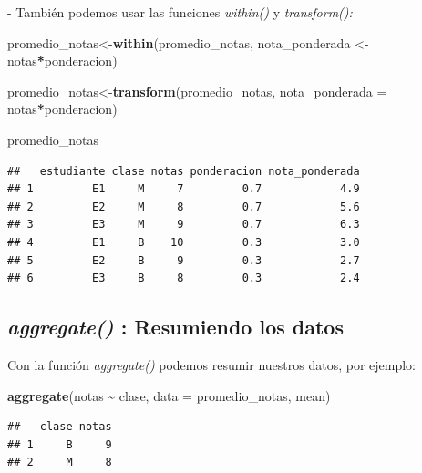 \documentclass[
]{book}
\newenvironment{Shaded}{\begin{snugshade}}{\end{snugshade}}
\newcommand{\AttributeTok}[1]{\textcolor[rgb]{0.13,0.29,0.53}{#1}}
\newcommand{\FunctionTok}[1]{\textcolor[rgb]{0.13,0.29,0.53}{\textbf{#1}}}
\newcommand{\NormalTok}[1]{#1}
\newcommand{\OtherTok}[1]{\textcolor[rgb]{0.56,0.35,0.01}{#1}}
\newcommand{\SpecialCharTok}[1]{\textcolor[rgb]{0.81,0.36,0.00}{\textbf{#1}}}
\begin{document}
\hfill\break
- También podemos usar las funciones \emph{within()} y \emph{transform():}\\

\begin{Shaded}
\begin{Highlighting}[]
\NormalTok{promedio\_notas}\OtherTok{\textless{}{-}}\FunctionTok{within}\NormalTok{(promedio\_notas,  nota\_ponderada }\OtherTok{\textless{}{-}}\NormalTok{ notas}\SpecialCharTok{*}\NormalTok{ponderacion) }

\NormalTok{promedio\_notas}\OtherTok{\textless{}{-}}\FunctionTok{transform}\NormalTok{(promedio\_notas,  }\AttributeTok{nota\_ponderada =}\NormalTok{ notas}\SpecialCharTok{*}\NormalTok{ponderacion) }

\NormalTok{promedio\_notas}
\end{Highlighting}
\end{Shaded}

\begin{verbatim}
##   estudiante clase notas ponderacion nota_ponderada
## 1         E1     M     7         0.7            4.9
## 2         E2     M     8         0.7            5.6
## 3         E3     M     9         0.7            6.3
## 4         E1     B    10         0.3            3.0
## 5         E2     B     9         0.3            2.7
## 6         E3     B     8         0.3            2.4
\end{verbatim}

\subsection{\texorpdfstring{\emph{aggregate()} : Resumiendo los datos}{aggregate() : Resumiendo los datos}}\label{aggregate-resumiendo-los-datos}

Con la función \emph{aggregate()} podemos resumir nuestros datos, por ejemplo:\\

\begin{Shaded}
\begin{Highlighting}[]
\FunctionTok{aggregate}\NormalTok{(notas }\SpecialCharTok{\textasciitilde{}}\NormalTok{ clase, }\AttributeTok{data =}\NormalTok{ promedio\_notas, mean)}
\end{Highlighting}
\end{Shaded}

\begin{verbatim}
##   clase notas
## 1     B     9
## 2     M     8
\end{verbatim}
\end{document}
